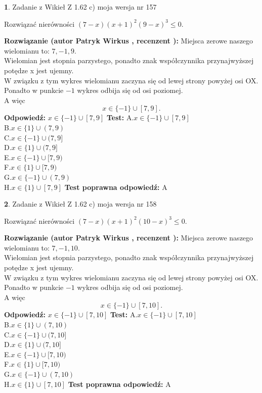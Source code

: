\documentclass[12pt, a4paper]{article}
\theoremstyle{definition} %
\newtheorem{zad}{}
\newcommand{\zadStart}[1]{\begin{zad}#1\newline}
\newcommand{\zadStop}{\end{zad}}
\newcommand{\rozwStart}[2]{\noindent \textbf{Rozwiązanie (autor #1 , recenzent #2): }\newline}
\newcommand{\rozwStop}{\newline}
\newcommand{\odpStart}{\noindent \textbf{Odpowiedź:}\newline}
\newcommand{\odpStop}{\newline}
\newcommand{\testStart}{\noindent \textbf{Test:}\newline}
\newcommand{\testStop}{\newline}
\newcommand{\kluczStart}{\noindent \textbf{Test poprawna odpowiedź:}\newline}
\newcommand{\kluczStop}{\newline}
\begin{document}
\zadStart{Zadanie z Wikieł Z 1.62 c) moja wersja nr 157}

Rozwiązać nierówności $(7-x)(x+1)^{2}(9-x)^{3}\le0$.
\zadStop
\rozwStart{Patryk Wirkus}{}
Miejsca zerowe naszego wielomianu to: $7, -1, 9$.\\
Wielomian jest stopnia parzystego, ponadto znak współczynnika przy\linebreak najwyższej potędze x jest ujemny.\\ W związku z tym wykres wielomianu zaczyna się od lewej strony powyżej osi OX.\\
Ponadto w punkcie $-1$ wykres odbija się od osi poziomej.\\
A więc $$x \in \{-1\} \cup [7,9].$$
\rozwStop
\odpStart
$x \in \{-1\} \cup [7,9]$
\odpStop
\testStart
A.$x \in \{-1\} \cup [7,9]$\\
B.$x \in \{1\} \cup (7,9)$\\
C.$x \in \{-1\} \cup (7,9]$\\
D.$x \in \{1\} \cup (7,9]$\\
E.$x \in \{-1\} \cup [7,9)$\\
F.$x \in \{1\} \cup [7,9)$\\
G.$x \in \{-1\} \cup (7,9)$\\
H.$x \in \{1\} \cup [7,9]$
\testStop
\kluczStart
A
\kluczStop



\zadStart{Zadanie z Wikieł Z 1.62 c) moja wersja nr 158}

Rozwiązać nierówności $(7-x)(x+1)^{2}(10-x)^{3}\le0$.
\zadStop
\rozwStart{Patryk Wirkus}{}
Miejsca zerowe naszego wielomianu to: $7, -1, 10$.\\
Wielomian jest stopnia parzystego, ponadto znak współczynnika przy\linebreak najwyższej potędze x jest ujemny.\\ W związku z tym wykres wielomianu zaczyna się od lewej strony powyżej osi OX.\\
Ponadto w punkcie $-1$ wykres odbija się od osi poziomej.\\
A więc $$x \in \{-1\} \cup [7,10].$$
\rozwStop
\odpStart
$x \in \{-1\} \cup [7,10]$
\odpStop
\testStart
A.$x \in \{-1\} \cup [7,10]$\\
B.$x \in \{1\} \cup (7,10)$\\
C.$x \in \{-1\} \cup (7,10]$\\
D.$x \in \{1\} \cup (7,10]$\\
E.$x \in \{-1\} \cup [7,10)$\\
F.$x \in \{1\} \cup [7,10)$\\
G.$x \in \{-1\} \cup (7,10)$\\
H.$x \in \{1\} \cup [7,10]$
\testStop
\kluczStart
A
\kluczStop
\end{document}
